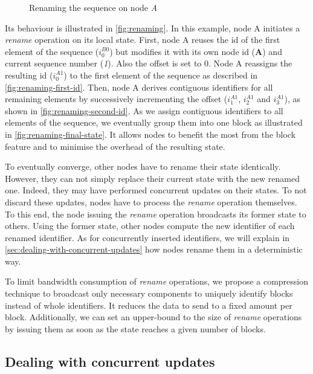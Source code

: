 \documentclass[10pt,journal,compsoc]{IEEEtran}
\let\MYoriglatexcaption\caption
\renewcommand{\caption}[2][\relax]{\MYoriglatexcaption[#2]{#2}}
\newcommand{\trm}[1]{\mathit{#1}}
\newcommand{\id}[3]{$\trm{#1}^{\trm{#2}}_{\trm{#3}}$}
\begin{document}
\begin{figure}[t!]
{
        \label{fig:renaming-final-state}}
    \caption{Renaming the sequence on node \emph{A}}
    \label{fig:renaming}
\end{figure}


Its behaviour is illustrated in \autoref{fig:renaming}.
In this example, node A initiates a \emph{rename} operation on its local state.
First, node A reuses the id of the first element of the sequence (\id{i}{B0}{0}) but modifies it with its own node id (\textbf{A}) and current sequence number (\emph{1}).
Also the offset is set to 0.
Node A reassigns the resulting id (\id{i}{A1}{0}) to the first element of the sequence as described in \autoref{fig:renaming-first-id}.
Then, node A derives contiguous identifiers for all remaining elements by successively incrementing the offset (\id{i}{A1}{1}, \id{i}{A1}{2} and \id{i}{A1}{3}), as shown in \autoref{fig:renaming-second-id}.
As we assign contiguous identifiers to all elements of the sequence, we eventually group them into one block as illustrated in \autoref{fig:renaming-final-state}.
It allows nodes to benefit the most from the block feature and to minimise the overhead of the resulting state.

To eventually converge, other nodes have to rename their state identically.
However, they can not simply replace their current state with the new renamed one.
Indeed, they may have performed concurrent updates on their states.
To not discard these updates, nodes have to process the \emph{rename} operation themselves.
To this end, the node issuing the \emph{rename} operation broadcasts its former state to others.
Using the former state, other nodes compute the new identifier of each renamed identifier.
As for concurrently inserted identifiers, we will explain in \autoref{sec:dealing-with-concurrent-updates} how nodes rename them in a deterministic way.

To limit bandwidth consumption of \emph{rename} operations, we propose a compression technique to broadcast only necessary components to uniquely identify blocks instead of whole identifiers.
It reduces the data to send to a fixed amount per block.
Additionally, we can set an upper-bound to the size of \emph{rename} operations by issuing them as soon as the state reaches a given number of blocks.

\subsection{Dealing with concurrent updates}
\end{document}
